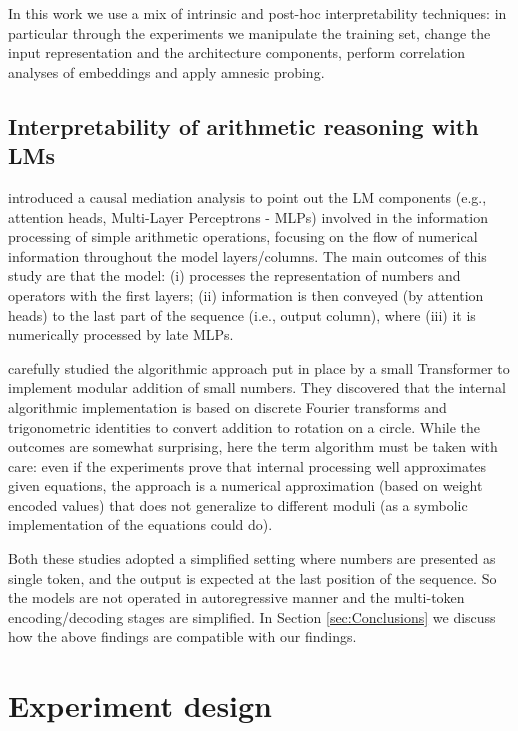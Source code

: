 \documentclass[final,1p,times,authoryear]{elsarticle}
\begin{document}
In this work we use a mix of intrinsic and post-hoc interpretability techniques: in particular through the experiments we manipulate the training set, change the input representation and the architecture components, perform correlation analyses of embeddings and apply amnesic probing.

\subsection{Interpretability of arithmetic reasoning with LMs} \label{subsec:MechanisticInterpretability}

\citet{Stolfo2023} introduced a causal mediation analysis to point out the LM components (e.g., attention heads, Multi-Layer Perceptrons - MLPs) involved in the information processing of simple arithmetic operations, focusing on the flow of numerical information throughout the model layers/columns. The main outcomes of this study are that the model: (i) processes the representation of numbers and operators with the first layers; (ii) information is then conveyed (by attention heads) to the last part of the sequence (i.e., output column), where (iii) it is numerically processed by late MLPs. 

\citet{Nanda2023} carefully studied the algorithmic approach put in place by a small Transformer to implement modular addition of small numbers. They discovered that the internal algorithmic implementation is based on discrete Fourier transforms and trigonometric identities to convert addition to rotation on a circle. While the outcomes are somewhat surprising, here the term algorithm must be taken with care: even if the experiments prove that internal processing well approximates given equations, the approach is a numerical approximation (based on weight encoded values) that does not generalize to different moduli (as a symbolic implementation of the equations could do).

Both these studies adopted a simplified setting where numbers are presented as single token, and the output is expected at the last position of the sequence. So the models are not operated in autoregressive manner and the multi-token encoding/decoding stages are simplified. In Section \ref{sec:Conclusions}  we discuss how the above findings are compatible with our findings.

\section{Experiment design} \label{sec:ExperimentDesign}
\end{document}
